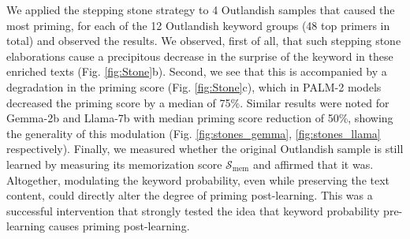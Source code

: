 \documentclass[11pt, a4paper, logo, copyright]{googledeepmind}
\theoremstyle{plain}
\theoremstyle{definition}
\theoremstyle{remark}
\begin{document}

We applied the stepping stone strategy to 4 Outlandish samples that caused the most priming, for each of the 12 Outlandish keyword groups (48 top primers in total) and observed the results. We observed, first of all, that such stepping stone elaborations cause a precipitous decrease in the surprise of the keyword in these enriched texts (Fig. \ref{fig:Stone}b). Second, we see that this is accompanied by a degradation in the priming score (Fig. \ref{fig:Stone}c), which in PALM-2 models decreased the priming score by a median of 75\%. Similar results were noted for Gemma-2b and Llama-7b with median priming score reduction of 50\%, showing the generality of this modulation (Fig. \ref{fig:stones_gemma}, \ref{fig:stones_llama} respectively). Finally, we measured whether the original Outlandish sample is still learned by measuring its memorization score $\mathcal{S}_\text{mem}$ and affirmed that it was. Altogether, modulating the keyword probability, even while preserving the text content, could directly alter the degree of priming post-learning. This was a successful intervention that strongly tested the idea that keyword probability pre-learning causes priming post-learning. 
\end{document}
